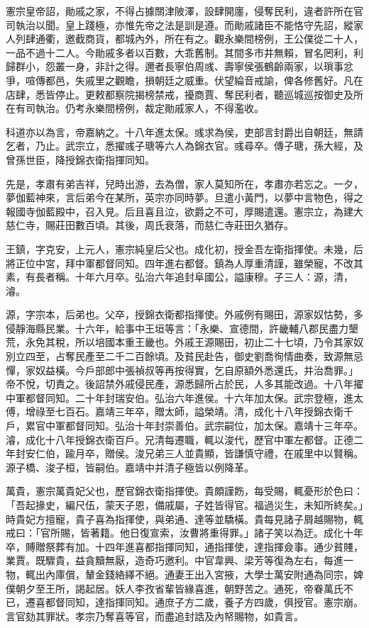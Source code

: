 \begin{pinyinscope}
憲宗皇帝詔，勛戚之家，不得占據關津陂澤，設肆開廛，侵奪民利，違者許所在官司執治以聞。皇上踐極，亦惟先帝之法是訓是遵。而勛戚諸臣不能恪守先詔，縱家人列肆通衢，邀截商貨，都城內外，所在有之。觀永樂間榜例，王公僕從二十人，一品不過十二人。今勛戚多者以百數，大乖舊制。其間多市井無賴，冒名罔利，利歸群小，怨叢一身，非計之得。邇者長寧伯周彧、壽寧侯張鶴齡兩家，以瑣事忿爭，喧傳都邑，失戚里之觀瞻，損朝廷之威重。伏望綸音戒諭，俾各修舊好。凡在店肆，悉皆停止。更敕都察院揭榜禁戒，擾商賈、奪民利者，聽巡城巡按御史及所在有司執治。仍考永樂間榜例，裁定勛戚家人，不得濫收。

科道亦以為言，帝嘉納之。十八年進太保。彧求為侯，吏部言封爵出自朝廷，無請乞者，乃止。武宗立，悉擢彧子瑭等六人為錦衣官。彧尋卒。傳子瑭，孫大經，及曾孫世臣，降授錦衣衛指揮同知。

先是，孝肅有弟吉祥，兒時出游，去為僧，家人莫知所在，孝肅亦若忘之。一夕，夢伽藍神來，言后弟今在某所，英宗亦同時夢。旦遣小黃門，以夢中言物色，得之報國寺伽藍殿中，召入見。后且喜且泣，欲爵之不可，厚賜遣還。憲宗立，為建大慈仁寺，賜莊田數百頃。其後，周氏衰落，而慈仁寺莊田久猶存。

王鎮，字克安，上元人，憲宗純皇后父也。成化初，授金吾左衛指揮使。未幾，后將正位中宮，拜中軍都督同知。四年進右都督。鎮為人厚重清謹，雖榮寵，不改其素，有長者稱。十年六月卒。弘治六年追封阜國公，謚康穆。子三人：源，清，濬。

源，字宗本，后弟也。父卒，授錦衣衛都指揮使。外戚例有賜田，源家奴怙勢，多侵靜海縣民業。十六年，給事中王垣等言：「永樂、宣德間，許畿輔八郡民盡力墾荒，永免其稅，所以培國本重王畿也。外戚王源賜田，初止二十七頃，乃令其家奴別立四至，占奪民產至二千二百餘頃。及貧民赴告，御史劉喬徇情曲奏，致源無忌憚，家奴益橫。今戶部郎中張禎叔等再按得實，乞自原額外悉還氏，并治喬罪。」帝不悅，切責之。後詔禁外戚侵民產，源悉歸所占於民，人多其能改過。十八年擢中軍都督同知。二十年封瑞安伯。弘治六年進侯。十六年加太保。武宗登極，進太傅，增祿至七百石。嘉靖三年卒，贈太師，謚榮靖。清，成化十八年授錦衣衛千戶，累官中軍都督同知。弘治十年封崇善伯。武宗嗣位，加太保。嘉靖十三年卒。濬，成化十八年授錦衣衛百戶。兄清每遷職，輒以浚代，歷官中軍左都督。正德二年封安仁伯，踰月卒，贈侯。浚兄弟三人並貴顯，皆謙慎守禮，在戚里中以賢稱。源子橋、浚子桓，皆嗣伯。嘉靖中并清子極皆以例降革。

萬貴，憲宗萬貴妃父也，歷官錦衣衛指揮使。貴頗謹飭，每受賜，輒憂形於色曰：「吾起掾史，編尺伍，蒙天子恩，備戚屬，子姓皆得官。福過災生，未知所終矣。」時貴妃方擅寵，貴子喜為指揮使，與弟通、達等並驕橫。貴每見諸子屑越賜物，輒戒曰：「官所賜，皆著籍。他日復宣索，汝曹將重得罪。」諸子笑以為迂。成化十年卒，賻贈祭葬有加。十四年進喜都指揮同知，通指揮使，達指揮僉事。通少貧賤，業賈。既驟貴，益貪黷無厭，造奇巧邀利。中官韋興、梁芳等復為左右，每進一物，輒出內庫償，輦金錢絡繹不絕。通妻王出入宮掖，大學士萬安附通為同宗，婢僕朝夕至王所，謁起居。妖人李孜省輩皆緣喜進，朝野苦之。通死，帝眷萬氏不已，遷喜都督同知，達指揮同知。通庶子方二歲，養子方四歲，俱授官。憲宗崩。言官劾其罪狀。孝宗乃奪喜等官，而盡追封誥及內帑賜物，如貴言。


\end{pinyinscope}
